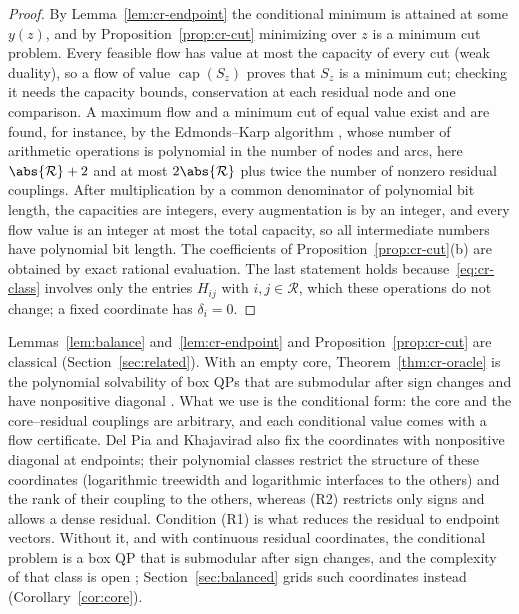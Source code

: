 \begin{proof}
By Lemma~\ref{lem:cr-endpoint} the conditional minimum is attained at some
$y(z)$, and by Proposition~\ref{prop:cr-cut} minimizing over $z$ is a
minimum cut problem. Every feasible flow has value at most the capacity of
every cut (weak duality), so a flow of value $\operatorname{cap}(S_z)$
proves that $S_z$ is a minimum cut; checking it needs the capacity bounds,
conservation at each residual node and one comparison. A maximum flow and a
minimum cut of equal value exist and are found, for instance, by the
Edmonds--Karp algorithm \cite{EdmondsKarp1972}, whose number of arithmetic
operations is polynomial in the number of nodes and arcs, here
$\abs{\mathcal R}+2$ and at most $2\abs{\mathcal R}$ plus twice the number
of nonzero residual couplings. After multiplication by a common denominator
of polynomial bit length, the capacities are integers, every augmentation is
by an integer, and every flow value is an integer at most the total
capacity, so all intermediate numbers have polynomial bit length. The
coefficients of Proposition~\ref{prop:cr-cut}(b) are obtained by exact
rational evaluation. The last statement holds because~\eqref{eq:cr-class}
involves only the entries $H_{ij}$ with $i,j\in\mathcal R$, which these
operations do not change; a fixed coordinate has $\delta_i=0$.
\end{proof}

\begin{remark}\label{rem:cr-cut-prior}
Lemmas~\ref{lem:balance} and~\ref{lem:cr-endpoint} and
Proposition~\ref{prop:cr-cut} are classical (Section~\ref{sec:related}).
With an empty core, Theorem~\ref{thm:cr-oracle} is the polynomial
solvability of box QPs that are submodular after sign changes and have
nonpositive diagonal \cite{Padberg1989,BurerNatarajanWillemsen2026v3}. What
we use is the conditional form: the core and the core--residual couplings
are arbitrary, and each conditional value comes with a flow certificate.
Del Pia and Khajavirad also fix the coordinates with nonpositive diagonal at
endpoints; their polynomial classes \cite[Theorem~4]{DelPiaKhajavirad2026}
restrict the structure of these coordinates (logarithmic treewidth and
logarithmic interfaces to the others) and the rank of their coupling to the
others, whereas (R2) restricts only signs and allows a dense residual.
Condition (R1) is what reduces the residual to endpoint vectors. Without it,
and with continuous residual coordinates, the conditional problem is a box
QP that is submodular after sign changes, and the complexity of that class
is open \cite[footnote~2]{BurerNatarajanWillemsen2026v3};
Section~\ref{sec:balanced} grids such coordinates instead
(Corollary~\ref{cor:core}).
\end{remark}

